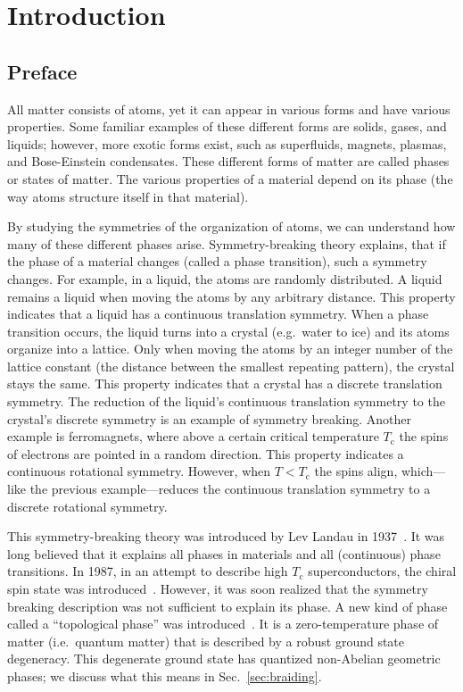 \chapter{Introduction}
\label{ch:introduction}

\section{Preface}

All matter consists of atoms, yet it can appear in various forms and have various properties.
Some familiar examples of these different forms are solids, gases, and liquids; however, more exotic forms exist, such as superfluids, magnets, plasmas, and Bose-Einstein condensates.
These different forms of matter are called phases or states of matter.
The various properties of a material depend on its phase (the way atoms structure itself in that material).

By studying the symmetries of the organization of atoms, we can understand how many of these different phases arise.
Symmetry-breaking theory explains, that if the phase of a material changes (called a phase transition), such a symmetry changes.
For example, in a liquid, the atoms are randomly distributed.
A liquid remains a liquid when moving the atoms by any arbitrary distance.
This property indicates that a liquid has a continuous translation symmetry.
When a phase transition occurs, the liquid turns into a crystal (e.g.~water to ice) and its atoms organize into a lattice.
Only when moving the atoms by an integer number of the lattice constant (the distance between the smallest repeating pattern), the crystal stays the same.
This property indicates that a crystal has a discrete translation symmetry.
The reduction of the liquid's continuous translation symmetry to the crystal's discrete symmetry is an example of symmetry breaking.
Another example is ferromagnets, where above a certain critical temperature $T_\textrm{c}$ the spins of electrons are pointed in a random direction.
This property indicates a continuous rotational symmetry.
However, when $T<T_\textrm{c}$ the spins align, which---like the previous example---reduces the continuous translation symmetry to a discrete rotational symmetry.

This symmetry-breaking theory was introduced by Lev Landau in 1937~\cite{Landau1937}.
It was long believed that it explains all phases in materials and all (continuous) phase transitions.
In 1987, in an attempt to describe high $T_\textrm{c}$ superconductors, the chiral spin state was introduced~\cite{Kalmeyer1987}.
However, it was soon realized that the symmetry breaking description was not sufficient to explain its phase.
A new kind of phase called a ``topological phase'' was introduced~\cite{Wen1989,XiaoGang1990}.
It is a zero-temperature phase of matter (i.e.~quantum matter) that is described by a robust ground state degeneracy.
This degenerate ground state has quantized non-Abelian geometric phases; we discuss what this means in Sec.~\ref{sec:braiding}.

